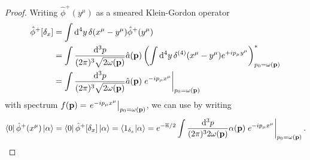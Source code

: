 \qkgcoherentwavefunction
\begin{proof}
	Writing $\hat\phi^+(y^\mu)$ as a smeared Klein-Gordon operator
	\begin{equation*}
		\begin{split}
			\hat\phi^+[\delta_x]
			&=
			\int\dd[4]{y}
			\delta(x^\mu-y^\mu)
			\hat\phi^+(y^\mu)
			\\
			&=
			\int\frac{\dd[3]{p}}{(2\pi)^3\sqrt{2\omega(\vb{p})}}
			\hat{a}(\vb{p})
			\left(
				\int\dd[4]{y}
				\delta^{(4)}(x^\mu-y^\mu)
				e^{+ip_\mu y^\mu}
			\right)_{p_0=\omega(\vb{p})}^*
			\\
			&=
			\int\frac{\dd[3]{p}}{(2\pi)^3\sqrt{2\omega(\vb{p})}}
			\hat{a}(\vb{p})
			\eval{e^{-ip_\mu x^\mu}}_{p_0=\omega(\vb{p})}
		\end{split}
	\end{equation*}
	with spectrum $f(\vb{p})=\eval{e^{-ip_\mu x^\mu}}_{p_0=\omega(\vb{p})}$, we can use  by writing
	\begin{equation*}
		\begin{split}
			\bra{0}
			\hat\phi^+(x^\mu)
			\ket{\alpha}
			=
			\bra{0}
			\hat\phi^+[\delta_x]
			\ket{\alpha}
			=
			\bra{1_{\delta_x}}
			\ket{\alpha}
			=
			e^{-\overline{n}/2}
			\int\frac{\dd[3]{p}}{(2\pi)^32\omega(\vb{p})}
			\alpha(\vb{p})
			\eval{e^{-ip_\mu x^\mu}}_{p_0=\omega(\vb{p})}
			.
		\end{split}
	\end{equation*}
\end{proof}